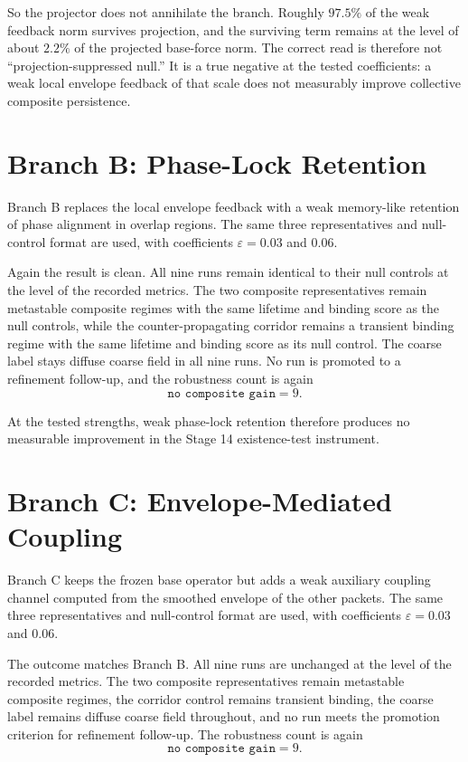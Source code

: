 \documentclass[11pt]{article}
\begin{document}
So the projector does not annihilate the branch. Roughly $97.5\%$ of the weak feedback norm survives projection, and the surviving term remains at the level of about $2.2\%$ of the projected base-force norm. The correct read is therefore not ``projection-suppressed null.'' It is a true negative at the tested coefficients: a weak local envelope feedback of that scale does not measurably improve collective composite persistence.

\section{Branch B: Phase-Lock Retention}

Branch B replaces the local envelope feedback with a weak memory-like retention of phase alignment in overlap regions. The same three representatives and null-control format are used, with coefficients $\varepsilon = 0.03$ and $0.06$.

Again the result is clean. All nine runs remain identical to their null controls at the level of the recorded metrics. The two composite representatives remain metastable composite regimes with the same lifetime and binding score as the null controls, while the counter-propagating corridor remains a transient binding regime with the same lifetime and binding score as its null control. The coarse label stays diffuse coarse field in all nine runs. No run is promoted to a refinement follow-up, and the robustness count is again
\[
\texttt{no composite gain} = 9.
\]

At the tested strengths, weak phase-lock retention therefore produces no measurable improvement in the Stage 14 existence-test instrument.

\section{Branch C: Envelope-Mediated Coupling}

Branch C keeps the frozen base operator but adds a weak auxiliary coupling channel computed from the smoothed envelope of the other packets. The same three representatives and null-control format are used, with coefficients $\varepsilon = 0.03$ and $0.06$.

The outcome matches Branch B. All nine runs are unchanged at the level of the recorded metrics. The two composite representatives remain metastable composite regimes, the corridor control remains transient binding, the coarse label remains diffuse coarse field throughout, and no run meets the promotion criterion for refinement follow-up. The robustness count is again
\[
\texttt{no composite gain} = 9.
\]
\end{document}
